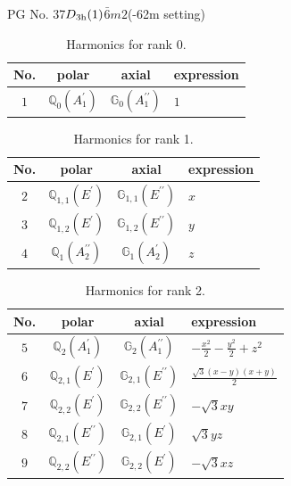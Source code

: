 \documentclass[fleqn,8pt,landscape]{jsarticle}
\begin{document}
\setcounter{MaxMatrixCols}{32}

\renewcommand{\tablename}{Table~}
\renewcommand{\figurename}{Figure~}
\begin{center}
\LARGE
PG No. 37\quad$D_{\rm 3h}(1)$\quad$\bar{6}m2$\quad(-62m setting)\quad[ hexagonal ]
\end{center}
\begin{table}[ht!]
\begin{center}
\caption{Harmonics for rank 0.}
\renewcommand{\arraystretch}{1.3}
\begin{tabular}{cccl} \hline \hline
No. & polar & axial & expression \\ \hline
$ 1 $ & $ \mathbb{Q}_{0}(A_{1}^{\prime}) $ & $ \mathbb{G}_{0}(A_{1}^{\prime\prime}) $ & $ 1 $ \\
 \hline \hline
\end{tabular}
\end{center}
\end{table}
\begin{table}[ht!]
\begin{center}
\caption{Harmonics for rank 1.}
\renewcommand{\arraystretch}{1.3}
\begin{tabular}{cccl} \hline \hline
No. & polar & axial & expression \\ \hline
$ 2 $ & $ \mathbb{Q}_{1,1}(E^{\prime}) $ & $ \mathbb{G}_{1,1}(E^{\prime\prime}) $ & $ x $ \\
$ 3 $ & $ \mathbb{Q}_{1,2}(E^{\prime}) $ & $ \mathbb{G}_{1,2}(E^{\prime\prime}) $ & $ y $ \\
$ 4 $ & $ \mathbb{Q}_{1}(A_{2}^{\prime\prime}) $ & $ \mathbb{G}_{1}(A_{2}^{\prime}) $ & $ z $ \\
 \hline \hline
\end{tabular}
\end{center}
\end{table}
\begin{table}[ht!]
\begin{center}
\caption{Harmonics for rank 2.}
\renewcommand{\arraystretch}{1.3}
\begin{tabular}{cccl} \hline \hline
No. & polar & axial & expression \\ \hline
$ 5 $ & $ \mathbb{Q}_{2}(A_{1}^{\prime}) $ & $ \mathbb{G}_{2}(A_{1}^{\prime\prime}) $ & $ - \frac{x^{2}}{2} - \frac{y^{2}}{2} + z^{2} $ \\
$ 6 $ & $ \mathbb{Q}_{2,1}(E^{\prime}) $ & $ \mathbb{G}_{2,1}(E^{\prime\prime}) $ & $ \frac{\sqrt{3} \left(x - y\right) \left(x + y\right)}{2} $ \\
$ 7 $ & $ \mathbb{Q}_{2,2}(E^{\prime}) $ & $ \mathbb{G}_{2,2}(E^{\prime\prime}) $ & $ - \sqrt{3} x y $ \\
$ 8 $ & $ \mathbb{Q}_{2,1}(E^{\prime\prime}) $ & $ \mathbb{G}_{2,1}(E^{\prime}) $ & $ \sqrt{3} y z $ \\
$ 9 $ & $ \mathbb{Q}_{2,2}(E^{\prime\prime}) $ & $ \mathbb{G}_{2,2}(E^{\prime}) $ & $ - \sqrt{3} x z $ \\
 \hline \hline
\end{tabular}
\end{center}
\end{table}
\end{document}
